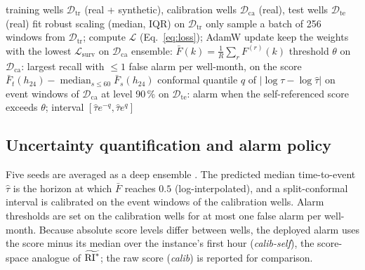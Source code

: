 \begin{algorithm}[t]
\caption{Training and deployment of PI-PatchSurv for one leave-one-well-out fold}\label{alg:train}
\footnotesize
\begin{algorithmic}[1]
\Require training wells $\mathcal{D}_{\mathrm{tr}}$ (real + synthetic), calibration wells $\mathcal{D}_{\mathrm{ca}}$ (real), test wells $\mathcal{D}_{\mathrm{te}}$ (real)
\State fit robust scaling (median, IQR) on $\mathcal{D}_{\mathrm{tr}}$ only
      \State sample a batch of 256 windows from $\mathcal{D}_{\mathrm{tr}}$; compute $\mathcal{L}$ (Eq.~\ref{eq:loss}); AdamW update
    \EndFor
    \State keep the weights with the lowest $\mathcal{L}_{\mathrm{surv}}$ on $\mathcal{D}_{\mathrm{ca}}$ 
  \EndFor
\EndFor
\State ensemble: $\bar F(k)=\frac{1}{R}\sum_r F^{(r)}(k)$
\State threshold $\theta$ on $\mathcal{D}_{\mathrm{ca}}$: largest recall with $\le 1$ false alarm per well-month,
\Statex \hspace{\algorithmicindent} on the score $\bar F_t(h_{24})-\operatorname{median}_{s\le 60}\bar F_s(h_{24})$
\State conformal quantile $q$ of $|\log\tau-\log\hat\tau|$ on event windows of $\mathcal{D}_{\mathrm{ca}}$ at level 90\,\%
\State on $\mathcal{D}_{\mathrm{te}}$: alarm when the self-referenced score exceeds $\theta$; interval $[\hat\tau e^{-q},\hat\tau e^{q}]$
\end{algorithmic}
\end{algorithm}

\subsection{Uncertainty quantification and alarm policy}

Five seeds are averaged as a deep ensemble \citep{lakshminarayanan2017}. The predicted median time-to-event
$\hat\tau$ is the horizon at which $\bar F$ reaches $0.5$ (log-interpolated), and a split-conformal
interval \citep{angelopoulos2023} is calibrated on the event windows of the calibration wells. Alarm
thresholds are set on the calibration wells for at most one false alarm per well-month. Because absolute
score levels differ between wells, the deployed alarm uses the score minus its median over the instance's
first hour (\emph{calib-self}), the score-space analogue of $\widetilde{\mathrm{RI}^{*}}$; the raw score
(\emph{calib}) is reported for comparison.
